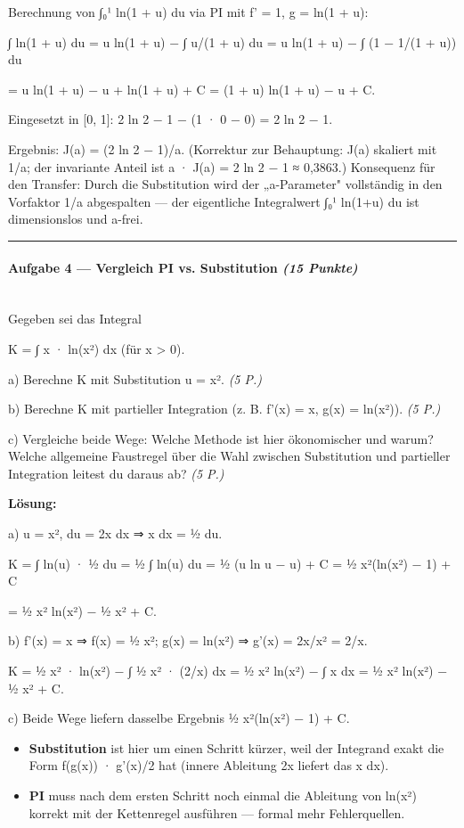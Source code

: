 \documentclass[11pt, a4paper]{article}
\begin{document}
Berechnung von ∫₀¹ ln(1 + u) du via PI mit f' = 1, g = ln(1 + u):

∫ ln(1 + u) du = u ln(1 + u) − ∫ u/(1 + u) du = u ln(1 + u) − ∫ (1 − 1/(1 + u)) du

= u ln(1 + u) − u + ln(1 + u) + C = (1 + u) ln(1 + u) − u + C.


Eingesetzt in [0, 1]: 2 ln 2 − 1 − (1 · 0 − 0) = 2 ln 2 − 1.


Ergebnis: J(a) = (2 ln 2 − 1)/a. (Korrektur zur Behauptung: J(a) skaliert mit 1/a; der invariante Anteil ist a · J(a) = 2 ln 2 − 1 ≈ 0,3863.) Konsequenz für den Transfer: Durch die Substitution wird der „a-Parameter" vollständig in den Vorfaktor 1/a abgespalten — der eigentliche Integralwert ∫₀¹ ln(1+u) du ist dimensionslos und a-frei.



\noindent\textcolor{rulegray}{\rule{\linewidth}{0.4pt}}


\paragraph{Aufgabe 4 — Vergleich PI vs. Substitution \textit{(15 Punkte)}}\mbox{}\\[2pt]

Gegeben sei das Integral

K = ∫ x · ln(x²) dx (für x > 0).


a) Berechne K mit Substitution u = x². \textit{(5 P.)}


b) Berechne K mit partieller Integration (z. B. f'(x) = x, g(x) = ln(x²)). \textit{(5 P.)}


c) Vergleiche beide Wege: Welche Methode ist hier ökonomischer und warum? Welche allgemeine Faustregel über die Wahl zwischen Substitution und partieller Integration leitest du daraus ab? \textit{(5 P.)}


\textbf{Lösung:}


a) u = x², du = 2x dx ⇒ x dx = ½ du.

K = ∫ ln(u) · ½ du = ½ ∫ ln(u) du = ½ (u ln u − u) + C = ½ x²(ln(x²) − 1) + C

= ½ x² ln(x²) − ½ x² + C.


b) f'(x) = x ⇒ f(x) = ½ x²; g(x) = ln(x²) ⇒ g'(x) = 2x/x² = 2/x.

K = ½ x² · ln(x²) − ∫ ½ x² · (2/x) dx = ½ x² ln(x²) − ∫ x dx = ½ x² ln(x²) − ½ x² + C.


c) Beide Wege liefern dasselbe Ergebnis ½ x²(ln(x²) − 1) + C.

\begin{itemize}
  \item \textbf{Substitution} ist hier um einen Schritt kürzer, weil der Integrand exakt die Form f(g(x)) · g'(x)/2 hat (innere Ableitung 2x liefert das x dx).
  \item \textbf{PI} muss nach dem ersten Schritt noch einmal die Ableitung von ln(x²) korrekt mit der Kettenregel ausführen — formal mehr Fehlerquellen.
\end{itemize}
\end{document}
